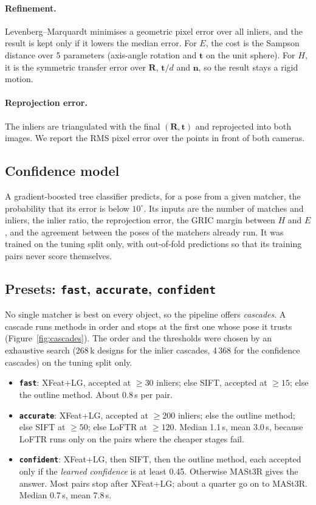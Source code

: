 \documentclass[11pt,a4paper]{article}
\newcommand{\R}{\mathbf{R}}
\newcommand{\tv}{\mathbf{t}}
\begin{document}
\paragraph{Refinement.} Levenberg--Marquardt minimises a geometric pixel error over all inliers,
and the result is kept only if it lowers the median error. For $E$, the cost is the Sampson
distance over 5 parameters (axis-angle rotation and $\tv$ on the unit sphere). For $H$, it is the
symmetric transfer error over $\R$, $\tv/d$ and $\mathbf{n}$, so the result stays a rigid motion.

\paragraph{Reprojection error.} The inliers are triangulated with the final $(\R,\tv)$ and reprojected
into both images. We report the RMS pixel error over the points in front of both cameras.

\subsection{Confidence model}
A gradient-boosted tree classifier \cite{sklearn} predicts, for a pose from a given matcher, the
probability that its error is below $10^\circ$. Its inputs are the number of matches and inliers,
the inlier ratio, the reprojection error, the GRIC margin between $H$ and $E$, and the agreement
between the poses of the matchers already run. It was trained on the tuning split only, with
out-of-fold predictions so that its training pairs never score themselves.

\subsection{Presets: \texttt{fast}, \texttt{accurate}, \texttt{confident}}
\label{sec:presets}

No single matcher is best on every object, so the pipeline offers \emph{cascades}. A cascade runs
methods in order and stops at the first one whose pose it trusts (Figure~\ref{fig:cascades}).
The order and the thresholds were chosen by an exhaustive search (268\,k designs for the inlier
cascades, 4\,368 for the confidence cascades) on the tuning split only.

\begin{itemize}
  \item \textbf{\texttt{fast}}: XFeat+LG, accepted at $\ge 30$ inliers; else SIFT, accepted at
        $\ge 15$; else the outline method. About 0.8\,s per pair.
  \item \textbf{\texttt{accurate}}: XFeat+LG, accepted at $\ge 200$ inliers; else the outline
        method; else SIFT at $\ge 50$; else LoFTR at $\ge 120$. Median 1.1\,s, mean 3.0\,s,
        because LoFTR runs only on the pairs where the cheaper stages fail.
  \item \textbf{\texttt{confident}}: XFeat+LG, then SIFT, then the outline method, each accepted only if
        the \emph{learned confidence} is at least 0.45. Otherwise MASt3R gives the answer. Most
        pairs stop after XFeat+LG; about a quarter go on to MASt3R. Median 0.7\,s, mean 7.8\,s.
\end{itemize}
\end{document}
